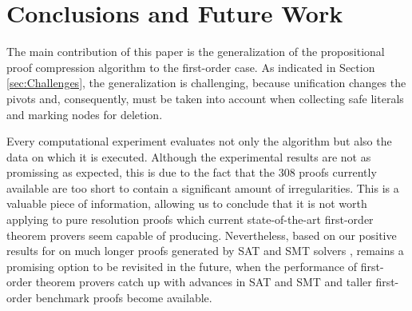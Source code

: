 \section{Conclusions and Future Work}\label{sec:conclusion}

The main contribution of this paper is the generalization of the propositional proof compression algorithm {\RPI} to the first-order case. As indicated in Section \ref{sec:Challenges}, the generalization is challenging, because unification changes the pivots and, consequently, must be taken into account when collecting safe literals and marking nodes for deletion.

Every computational experiment evaluates not only the algorithm but also the data on which it is executed. Although the experimental results are not as promissing as expected, this is due to the fact that the 308 proofs currently available are too short to contain a significant amount of irregularities. This is a valuable piece of information, allowing us to conclude that it is not worth applying {\FORPI} to pure resolution proofs which current state-of-the-art first-order theorem provers seem capable of producing. Nevertheless, based on our positive results for {\RPI} on much longer proofs generated by SAT and SMT solvers \cite{LURPI}, {\FORPI} remains a promising option to be revisited in the future, when the performance of first-order theorem provers catch up with advances in SAT and SMT and taller first-order benchmark proofs become available.




